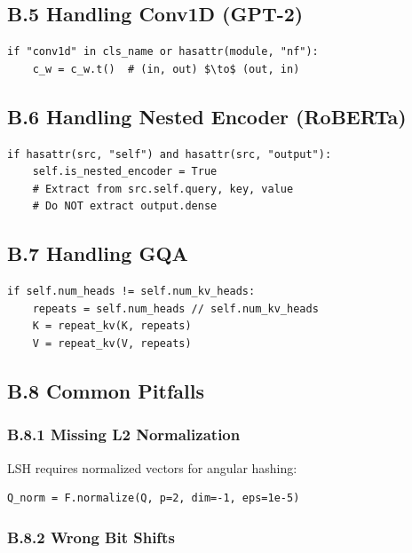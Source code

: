 \subsection{B.5 Handling Conv1D (GPT-2)}

\begin{lstlisting}
if "conv1d" in cls_name or hasattr(module, "nf"):
    c_w = c_w.t()  # (in, out) $\to$ (out, in)
\end{lstlisting}

\subsection{B.6 Handling Nested Encoder (RoBERTa)}

\begin{lstlisting}
if hasattr(src, "self") and hasattr(src, "output"):
    self.is_nested_encoder = True
    # Extract from src.self.query, key, value
    # Do NOT extract output.dense
\end{lstlisting}

\subsection{B.7 Handling GQA}

\begin{lstlisting}
if self.num_heads != self.num_kv_heads:
    repeats = self.num_heads // self.num_kv_heads
    K = repeat_kv(K, repeats)
    V = repeat_kv(V, repeats)
\end{lstlisting}

\subsection{B.8 Common Pitfalls}

\subsubsection{B.8.1 Missing L2 Normalization}

LSH requires normalized vectors for angular hashing:

\begin{lstlisting}
Q_norm = F.normalize(Q, p=2, dim=-1, eps=1e-5)
\end{lstlisting}

\subsubsection{B.8.2 Wrong Bit Shifts}

